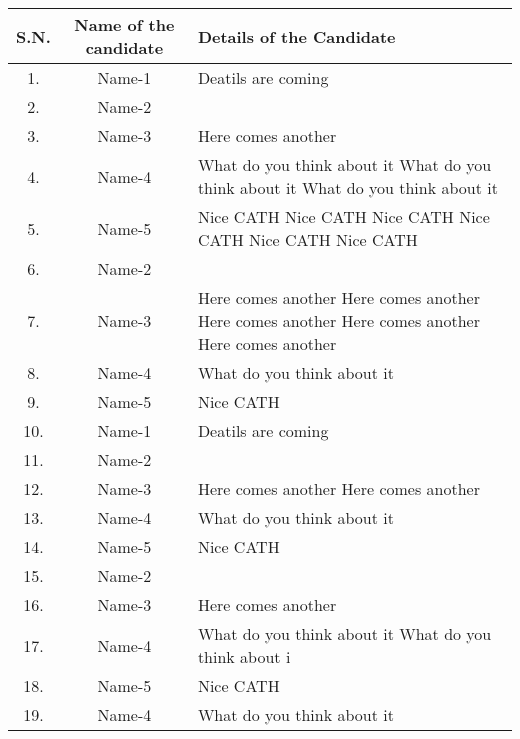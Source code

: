 \documentclass{article}
\begin{document}
		\begin{sidewaystable}[h]
		\begin{center}
			\begin{tabular}{|c| c| l|}
				\hline
				S.N.   & Name of the candidate & Details of the Candidate \\     \hline
				1.       & Name-1                        & Deatils are coming \\ \hline
				2.      & Name-2                        & \\  \hline
				3.      & Name-3                        & Here comes another \\ \hline
				4.      & Name-4                        & What do you think about it What do you think about it What do you think about it \\  \hline
				5.      & Name-5                        & Nice CATH Nice CATH Nice CATH Nice CATH Nice CATH Nice CATH\\   \hline
				6.      & Name-2                        & \\  \hline
				7.      & Name-3                        & Here comes another Here comes another Here comes another Here comes another Here comes another \\ \hline
				8.      & Name-4                        & What do you think about it \\  \hline
				9.      & Name-5                        & Nice CATH \\   \hline
				10.       & Name-1                        & Deatils are coming \\ \hline
				11.      & Name-2                        & \\  \hline
				12.      & Name-3                        & Here comes another  Here comes another\\ \hline
				13.      & Name-4                        & What do you think about it \\  \hline
				14.      & Name-5                        & Nice CATH \\   \hline
				15.      & Name-2                        & \\  \hline
				16.      & Name-3                        & Here comes another \\ \hline
				17.      & Name-4                        & What do you think about it What do you think about i \\  \hline
				18.      & Name-5                        & Nice CATH \\   \hline
				19.      & Name-4                        & What do you think about it \\  \hline

\end{tabular}
\end{center}
\end{sidewaystable}
\end{document}
